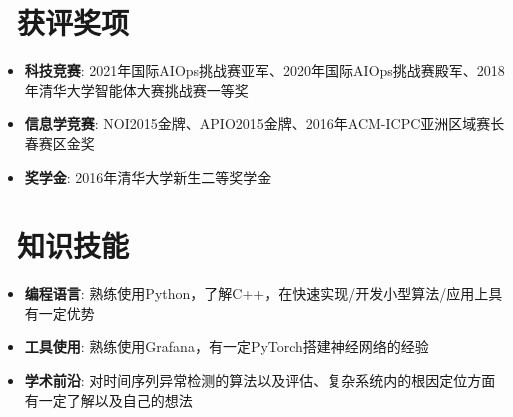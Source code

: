 \documentclass[utf8,letterpaper,11pt]{ctexart}
\newcommand{\resumeItem}[2]{
  \item\small{
    \textbf{#1}{: #2 \vspace{-2pt}}
  }
}
\newcommand{\resumeSubItem}[2]{\resumeItem{#1}{#2}\vspace{-4pt}}
\newcommand{\resumeSubHeadingListStart}{\begin{itemize}[leftmargin=*]}
\newcommand{\resumeSubHeadingListEnd}{\end{itemize}}
\begin{document}
\section{\faAward \ 获评奖项}
  \resumeSubHeadingListStart
    \resumeSubItem{科技竞赛}
    {2021年国际AIOps挑战赛亚军、2020年国际AIOps挑战赛殿军、2018年清华大学智能体大赛挑战赛一等奖}
    \resumeSubItem{信息学竞赛}
      {NOI2015金牌、APIO2015金牌、2016年ACM-ICPC亚洲区域赛长春赛区金奖}
    \resumeSubItem{奖学金}
      {2016年清华大学新生二等奖学金}
  \resumeSubHeadingListEnd
\vspace{1pt}
\section{\faCog \ 知识技能}
  \resumeSubHeadingListStart
    \resumeSubItem{编程语言}
    {熟练使用Python，了解C++，在快速实现/开发小型算法/应用上具有一定优势}
    \resumeSubItem{工具使用}
    {熟练使用Grafana，有一定PyTorch搭建神经网络的经验}
    \resumeSubItem{学术前沿}
    {对时间序列异常检测的算法以及评估、复杂系统内的根因定位方面有一定了解以及自己的想法}
  \resumeSubHeadingListEnd
\end{document}
